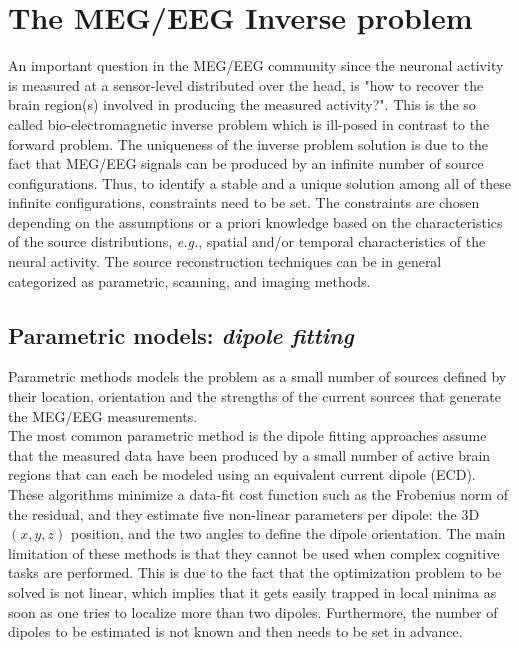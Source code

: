 
\section{The MEG/EEG Inverse problem}
An important question in the MEG/EEG community since the neuronal activity is measured at a sensor-level distributed over the head, is "how to recover the brain region(s) involved in producing the measured activity?". This is the so called bio-electromagnetic inverse problem which is ill-posed in contrast to the forward problem. The uniqueness of the inverse problem solution is due to the fact that MEG/EEG signals can be produced by an infinite number of source configurations. Thus, to identify a stable and a unique solution among all of these infinite configurations, constraints need to be set. The constraints are chosen depending on the assumptions or a priori knowledge based on the characteristics of the source distributions, \textit{e.g.}, spatial and/or temporal characteristics of the neural activity. The source reconstruction techniques can be in general categorized as parametric, scanning, and imaging methods.

\subsection{Parametric models: \textit{dipole fitting}} \label{section_dipfit}
Parametric methods models the problem as a small number of sources defined by their location, orientation and the strengths of the current sources that generate the MEG/EEG measurements.\\
The most common parametric method is the dipole fitting approaches \cite{scherg1985two,mosher1992multiple,scherg1990fundamentals} assume that the measured data have been produced by a small number of active brain regions that can each be modeled using an equivalent current dipole (ECD). These algorithms minimize a data-fit cost function such as the Frobenius norm of the residual, and they estimate five non-linear parameters per dipole: the 3D $(x,y,z)$ position, and the two angles to define the dipole orientation. The main limitation of these methods is that they cannot be used when complex cognitive tasks are performed. This is due to the fact that the optimization problem to be solved is not linear, which implies that it gets easily trapped in local minima as soon as one tries to localize more than two dipoles. Furthermore, the number of dipoles to be estimated is not known and then needs to be set in advance. 

